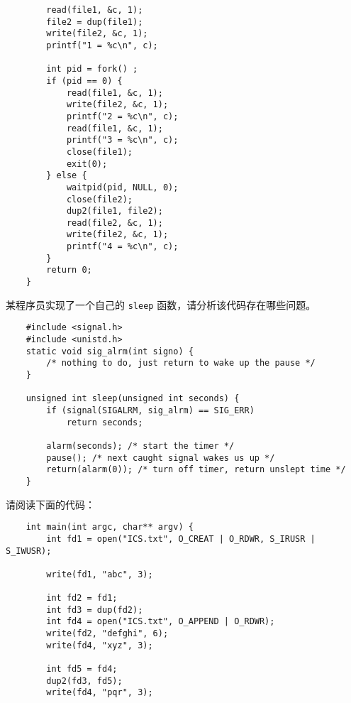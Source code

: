 \begin{problems}
\begin{verbatim}
        read(file1, &c, 1);
        file2 = dup(file1);
        write(file2, &c, 1);
        printf("1 = %c\n", c);

        int pid = fork() ;
        if (pid == 0) {
            read(file1, &c, 1);
            write(file2, &c, 1);
            printf("2 = %c\n", c);
            read(file1, &c, 1);
            printf("3 = %c\n", c);
            close(file1);
            exit(0);
        } else {
            waitpid(pid, NULL, 0);
            close(file2);
            dup2(file1, file2);
            read(file2, &c, 1);
            write(file2, &c, 1);
            printf("4 = %c\n", c);
        }
        return 0;
    }
        \end{verbatim}
         某程序员实现了一个自己的 \verb|sleep| 函数，请分析该代码存在哪些问题。
        \begin{verbatim}
    #include <signal.h>
    #include <unistd.h>
    static void sig_alrm(int signo) {
        /* nothing to do, just return to wake up the pause */
    }

    unsigned int sleep(unsigned int seconds) {
        if (signal(SIGALRM, sig_alrm) == SIG_ERR)
            return seconds;

        alarm(seconds); /* start the timer */
        pause(); /* next caught signal wakes us up */
        return(alarm(0)); /* turn off timer, return unslept time */
    }
        \end{verbatim}
         请阅读下面的代码：
        \begin{verbatim}
    int main(int argc, char** argv) {
        int fd1 = open("ICS.txt", O_CREAT | O_RDWR, S_IRUSR | S_IWUSR);
        
        write(fd1, "abc", 3);

        int fd2 = fd1;
        int fd3 = dup(fd2);
        int fd4 = open("ICS.txt", O_APPEND | O_RDWR);
        write(fd2, "defghi", 6);
        write(fd4, "xyz", 3);

        int fd5 = fd4;
        dup2(fd3, fd5);
        write(fd4, "pqr", 3);


\end{verbatim}
\end{problems}
